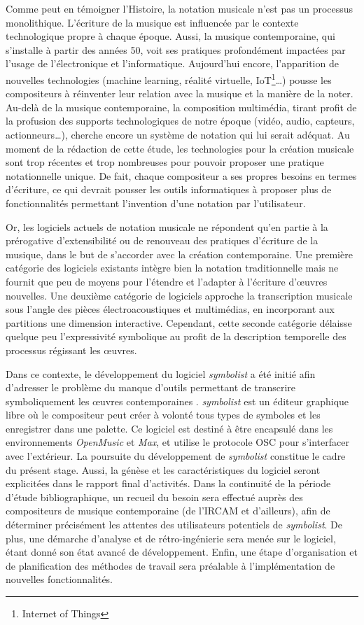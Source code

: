 Comme peut en témoigner l'Histoire, la notation musicale n'est pas un processus monolithique. L'écriture de la musique est influencée par le contexte technologique propre à chaque époque. Aussi, la musique contemporaine, qui s'installe à partir des années 50, voit ses pratiques profondément impactées par l'usage de l'électronique et l'informatique. Aujourd'hui encore, l'apparition de nouvelles technologies (machine learning, réalité virtuelle, IoT\footnote{Internet of Things}…) pousse les compositeurs à réinventer leur relation avec la musique et la manière de la noter. Au-delà de la musique contemporaine, la composition multimédia, tirant profit de la profusion des supports technologiques de notre époque (vidéo, audio, capteurs, actionneurs…), cherche encore un système de notation qui lui serait adéquat. Au moment de la rédaction de cette étude, les technologies pour la création musicale sont trop récentes et trop nombreuses pour pouvoir proposer une pratique notationnelle unique. De fait, chaque compositeur a ses propres besoins en termes d'écriture, ce qui devrait pousser les outils informatiques à proposer plus de fonctionnalités permettant l'invention d'une notation par l'utilisateur.

Or, les logiciels actuels de notation musicale ne répondent qu'en partie à la prérogative d'extensibilité ou de renouveau des pratiques d'écriture de la musique, dans le but de s'accorder avec la création contemporaine. Une première catégorie des logiciels existants intègre bien la notation traditionnelle mais ne fournit que peu de moyens pour l'étendre et l'adapter à l'écriture d'œuvres nouvelles. Une deuxième catégorie de logiciels approche la transcription musicale sous l'angle des pièces électroacoustiques et multimédias, en incorporant aux partitions une dimension interactive. Cependant, cette seconde catégorie délaisse quelque peu l'expressivité symbolique au profit de la description temporelle des processus régissant les œuvres.

Dans ce contexte, le développement du logiciel \textit{symbolist} a été initié afin d'adresser le problème du manque d'outils permettant de transcrire symboliquement les œuvres contemporaines \cite{gottfried2018}.
\textit{symbolist} est un éditeur graphique libre où le compositeur peut créer à volonté tous types de symboles et les enregistrer dans une palette. Ce logiciel est destiné à être encapsulé dans les environnements \textit{OpenMusic} et \textit{Max}, et utilise le protocole OSC pour s'interfacer avec l'extérieur.
La poursuite du développement de \textit{symbolist} constitue le cadre du présent stage. Aussi, la génèse et les caractéristiques du logiciel seront explicitées dans le rapport final d'activités.
Dans la continuité de la période d'étude bibliographique, un recueil du besoin sera effectué auprès des compositeurs de musique contemporaine (de l'IRCAM et d'ailleurs), afin de déterminer précisément les attentes des utilisateurs potentiels de \textit{symbolist}.
De plus, une démarche d'analyse et de rétro-ingénierie sera menée sur le logiciel, étant donné son état avancé de développement.
Enfin, une étape d'organisation et de planification des méthodes de travail sera préalable à l'implémentation de nouvelles fonctionnalités.   
 